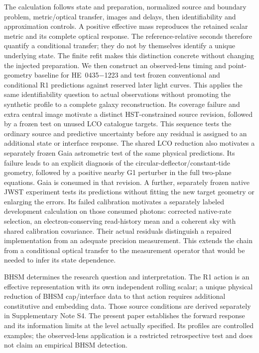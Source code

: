 The calculation follows state and preparation, normalized source and
boundary problem, metric/optical transfer, images and delays, then
identifiability and approximation controls. A positive effective mass
reproduces the retained scalar metric and its complete optical
response. The reference-relative seconds therefore quantify a
conditional transfer; they do not by themselves identify a unique
underlying state. The finite refit makes this distinction concrete
without changing the injected preparation.
We then construct an observed-lens timing and point-geometry baseline
for HE~0435$-$1223 and test frozen conventional and conditional R1
predictions against reserved later light curves. This applies the same
identifiability question to actual observations without promoting the
synthetic profile to a complete galaxy reconstruction. Its coverage failure
and extra central image motivate a distinct HST-constrained source revision,
followed by a frozen test on unused LCO catalogue targets. This sequence tests the
ordinary source and predictive uncertainty before any residual is assigned
to an additional state or interface response.
The shared LCO reduction also motivates a separately frozen Gaia
astrometric test of the same physical predictions. Its failure leads to
an explicit diagnosis of the circular-deflector/constant-tide geometry,
followed by a positive nearby G1 perturber in the full two-plane
equations. Gaia is consumed in that revision. A further, separately
frozen native JWST experiment tests its predictions without fitting
the new target geometry or enlarging the errors.
Its failed calibration motivates a separately labeled development
calculation on those consumed photons: corrected native-rate selection,
an electron-conserving read-history mean and a coherent sky with shared
calibration covariance. Their actual residuals distinguish a repaired
implementation from an adequate precision measurement. This extends
the chain from a conditional optical transfer to the measurement
operator that would be needed to infer its state dependence.

BHSM determines the research question and interpretation. The R1 action
is an effective representation with its own independent rolling scalar;
a unique physical reduction of BHSM cap/interface data to that action
requires additional constitutive and embedding data. Those source
conditions are derived separately in Supplementary Note S4. The present
paper establishes the forward response and its information limits at
the level actually specified. Its profiles are controlled examples;
the observed-lens application is a restricted retrospective test and
does not claim an empirical BHSM detection.

